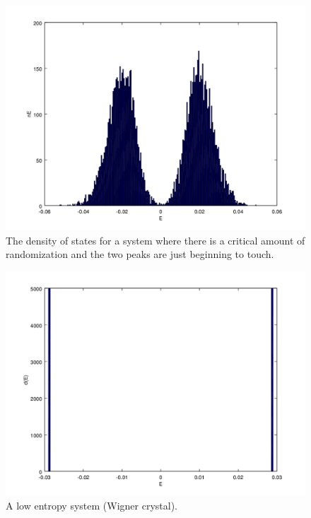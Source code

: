 \begin{figure}[htbp]
\begin{center}
\includegraphics[scale=.50]{critDoS.png}
\caption{The density of states for a system where there is a critical amount of randomization and the two peaks are just beginning to touch.}
\label{critDoS}
\end{center}
\end{figure}


\begin{figure}[htbp]
\begin{center}
\includegraphics[scale=.50]{splitDos.png}
\caption{A low entropy system (Wigner crystal).}
\label{crystalDoS}
\end{center}
\end{figure}




